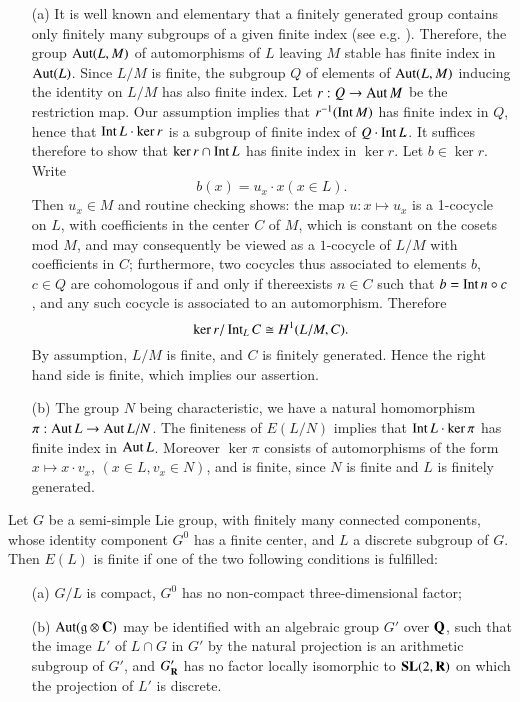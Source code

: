 \begin{itemize}
\item[(a)] It is well known and elementary that a finitely generated group contains only finitely many subgroups of a given finite index (see e.g. \cite{art04-key11}). Therefore, the group $\operatorname{\mathrm{Aut}} (L,M)$ of automorphisms of $L$ leaving $M$ stable has finite index in $\operatorname{\mathrm{Aut}}(L)$. Since $L/M$ is finite, the subgroup $Q$ of elements of $\operatorname{\mathrm{Aut}}(L,M)$ inducing the identity on $L/M$ has also finite index. Let $r:Q\to \operatorname{\mathrm{Aut}} M$ be the restriction map. Our assumption implies that $r^{-1}(\operatorname{\mathrm{Int}} M)$ has finite index in $Q$, hence that $\operatorname{\mathrm{Int}} L\cdot \ker r$ is a subgroup of finite index of $Q\cdot \operatorname{\mathrm{Int}} L$. It suffices therefore to show that $\ker r\cap \operatorname{\mathrm{Int}} L$ has finite index in $\ker r$. Let $b\in \ker r$. Write
$$
b(x)=u_{x}\cdot x(x\in L).
$$
Then $u_{x}\in M$ and routine checking shows: the map $u:x\mapsto u_{x}$ is a 1-cocycle on $L$, with coefficients in the center $C$ of $M$, which is constant on the cosets mod $M$, and may consequently be viewed as a $1$-cocycle of $L/M$ with coefficients in $C$; furthermore, two cocycles thus associated to elements $b$, $c\in Q$ are cohomologous if and only if there\pageoriginale exists $n\in C$ such that $b=\operatorname{\mathrm{Int}} n\circ c$, and any such cocycle is associated to an automorphism. Therefore
$$
\ker r/\operatorname{\mathrm{Int}}_{L}C\cong H^{1}(L/M,C).
$$
By assumption, $L/M$ is finite, and $C$ is finitely generated. Hence the right hand side is finite, which implies our assertion.

\item[(b)] The group $N$ being characteristic, we have a natural homomorphism $\pi:\operatorname{\mathrm{Aut}} L\to \operatorname{\mathrm{Aut}} L/N$. The finiteness of $E(L/N)$ implies that $\operatorname{\mathrm{Int}} L\cdot \ker \pi$ has finite index in $\operatorname{\mathrm{Aut}} L$. Moreover $\ker \pi$ consists of automorphisms of the form $x\mapsto x\cdot v_{x}$, $(x\in L, v_{x}\in N)$, and is finite, since $N$ is finite and $L$ is finitely generated.
\end{itemize}

\begin{theorem}\label{art04-thm1.5}
Let $G$ be a semi-simple Lie group, with finitely many connected components, whose identity component $G^{0}$ has a finite center, and $L$ a discrete subgroup of $G$. Then $E(L)$ is finite if one of the two following conditions is fulfilled:
\begin{itemize}
\item[{\rm(a)}] $G/L$ is compact, $G^{0}$ has no non-compact three-dimensional factor;

\item[{\rm(b)}] $\operatorname{\mathrm{Aut}}(\mathfrak{g}\otimes \mathbf{C})$ may be identified with an algebraic group $G'$ over $\mathbf{Q}$, such that the image $L'$ of $L\cap G$ in $G'$ by the natural projection is an arithmetic subgroup of $G'$, and $G'_{\mathbf{R}}$ has no factor locally isomorphic to $\mathbf{SL}(2,\mathbf{R})$ on which the projection of $L'$ is discrete.
\end{itemize}
\end{theorem}

